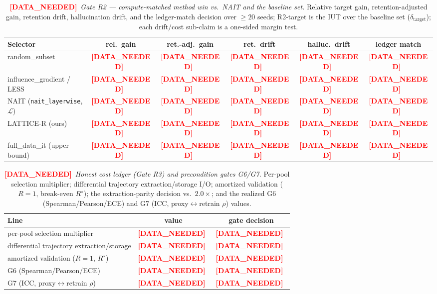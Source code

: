 \documentclass[11pt]{article}
\theoremstyle{definition}
\newcommand{\Lset}{\mathcal{L}}
\newcommand{\dataneeded}[1]{\textcolor{red}{\textbf{[DATA\_NEEDED]}}~\emph{#1}}
\begin{document}
\begin{table}[t]
\centering
\caption{\dataneeded{Gate R2 --- compute-matched method win vs.\ NAIT and the baseline set.}
Relative target gain, retention-adjusted gain, retention drift, hallucination drift, and the
ledger-match decision over $\ge20$ seeds; R2-target is the IUT over the baseline set
($\delta_{\mathrm{target}}$); each drift/cost sub-claim is a one-sided margin test.}
\label{tab:r2}
\begin{tabular}{lccccc}
\toprule
Selector & rel.\ gain & ret.-adj.\ gain & ret.\ drift & halluc.\ drift & ledger match \\
\midrule
random\_subset                  & \dataneeded{} & \dataneeded{} & \dataneeded{} & \dataneeded{} & \dataneeded{} \\
influence\_gradient / LESS       & \dataneeded{} & \dataneeded{} & \dataneeded{} & \dataneeded{} & \dataneeded{} \\
NAIT (\texttt{nait\_layerwise}, $\Lset$) & \dataneeded{} & \dataneeded{} & \dataneeded{} & \dataneeded{} & \dataneeded{} \\
LATTICE-R (ours)                 & \dataneeded{} & \dataneeded{} & \dataneeded{} & \dataneeded{} & \dataneeded{} \\
full\_data\_it (upper bound)     & \dataneeded{} & \dataneeded{} & \dataneeded{} & \dataneeded{} & \dataneeded{} \\
\bottomrule
\end{tabular}
\end{table}

\begin{table}[t]
\centering
\caption{\dataneeded{Honest cost ledger (Gate R3) and precondition gates G6/G7.} Per-pool
selection multiplier; differential trajectory extraction/storage I/O; amortized validation
($R{=}1$, break-even $R^\star$); the extraction-parity decision vs.\ $2.0\times$; and the
realized G6 (Spearman/Pearson/ECE) and G7 (ICC, proxy$\leftrightarrow$retrain $\rho$) values.}
\label{tab:cost}
\begin{tabular}{lcc}
\toprule
Line & value & gate decision \\
\midrule
per-pool selection multiplier                & \dataneeded{} & \dataneeded{} \\
differential trajectory extraction/storage   & \dataneeded{} & \dataneeded{} \\
amortized validation ($R{=}1$, $R^\star$)    & \dataneeded{} & \dataneeded{} \\
G6 (Spearman/Pearson/ECE)                    & \dataneeded{} & \dataneeded{} \\
G7 (ICC, proxy$\leftrightarrow$retrain $\rho$) & \dataneeded{} & \dataneeded{} \\
\bottomrule
\end{tabular}
\end{table}
\end{document}
